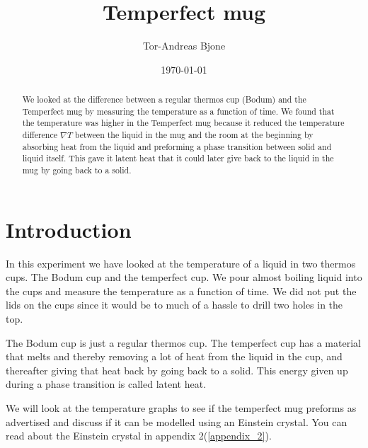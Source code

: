 \documentclass[reprint,english,notitlepage]{revtex4-1}  %
\begin{document}
\title{Temperfect mug}   %
\author{Tor-Andreas Bjone}               %
\date{\today}                             %
\noaffiliation                            %
\begin{abstract}                          %
We looked at the difference between a regular thermos cup (Bodum) and the Temperfect mug by measuring the temperature as a function of time. We found that the temperature was higher in the Temperfect mug because it reduced the temperature difference $\nabla T$ between the liquid in the mug and the room at the beginning by absorbing heat from the liquid and preforming a phase transition between solid and liquid itself. This gave it latent heat that it could later give back to the liquid in the mug by going back to a solid.
\end{abstract}                            %
\maketitle                                %


\section{Introduction}
In this experiment we have looked at the temperature of a liquid in two thermos cups. The Bodum cup and the temperfect cup. We pour almost boiling liquid into the cups and measure the temperature as a function of time. We did not put the lids on the cups since it would be to much of a hassle to drill two holes in the top. 

The Bodum cup is just a regular thermos cup. The temperfect cup has a material that melts and thereby removing a lot of heat from the liquid in the cup, and thereafter giving that heat back by going back to a solid. This energy given up during a phase transition is called latent heat. 

We will look at the temperature graphs to see if the temperfect mug preforms as advertised and discuss if it can be modelled using an Einstein crystal. You can read about the Einstein crystal in appendix 2(\ref{appendix_2}).
\end{document}
